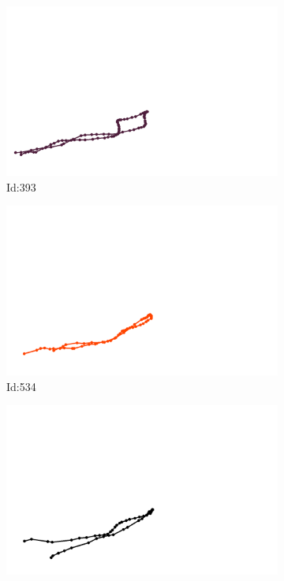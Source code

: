 \documentclass[12pt,twoside]{report}
\begin{document}
\begin{figure}
\centering
\begin{subfigure}[b]{0.20\textwidth}
\centering
\includegraphics[width=\textwidth]{../../trajectories/393.png}
\caption{Id:393}
\end{subfigure}
\begin{subfigure}[b]{0.20\textwidth}
\centering
\includegraphics[width=\textwidth]{../../trajectories/534.png}
\caption{Id:534}
\end{subfigure}
\begin{subfigure}[b]{0.20\textwidth}
\centering
\includegraphics[width=\textwidth]{../../trajectories/780.png}

\end{subfigure}
\end{figure}
\end{document}
